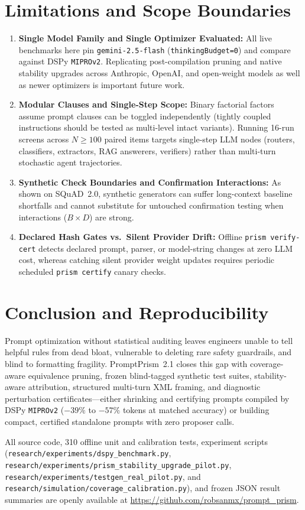 \documentclass[11pt,a4paper]{article}
\newcommand{\method}{PromptPrism}
\begin{document}
\section{Limitations and Scope Boundaries}
\begin{enumerate}[leftmargin=*,nosep]
    \item \textbf{Single Model Family and Single Optimizer Evaluated:} All live benchmarks here pin \texttt{gemini-2.5-flash} (\texttt{thinkingBudget=0}) and compare against DSPy \texttt{MIPROv2}. Replicating post-compilation pruning and native stability upgrades across Anthropic, OpenAI, and open-weight models as well as newer optimizers is important future work.
    \item \textbf{Modular Clauses and Single-Step Scope:} Binary factorial factors assume prompt clauses can be toggled independently (tightly coupled instructions should be tested as multi-level intact variants). Running 16-run screens across $N \ge 100$ paired items targets single-step LLM nodes (routers, classifiers, extractors, RAG answerers, verifiers) rather than multi-turn stochastic agent trajectories.
    \item \textbf{Synthetic Check Boundaries and Confirmation Interactions:} As shown on SQuAD~2.0, synthetic generators can suffer long-context baseline shortfalls and cannot substitute for untouched confirmation testing when interactions ($B \times D$) are strong.
    \item \textbf{Declared Hash Gates vs.\ Silent Provider Drift:} Offline \texttt{prism verify-cert} detects declared prompt, parser, or model-string changes at zero LLM cost, whereas catching silent provider weight updates requires periodic scheduled \texttt{prism certify} canary checks.
\end{enumerate}

\section{Conclusion and Reproducibility}
Prompt optimization without statistical auditing leaves engineers unable to tell helpful rules from dead bloat, vulnerable to deleting rare safety guardrails, and blind to formatting fragility. \method{}~2.1 closes this gap with coverage-aware equivalence pruning, frozen blind-tagged synthetic test suites, stability-aware attribution, structured multi-turn XML framing, and diagnostic perturbation certificates---either shrinking and certifying prompts compiled by DSPy \texttt{MIPROv2} ($-39\%$ to $-57\%$ tokens at matched accuracy) or building compact, certified standalone prompts with zero proposer calls.

{\raggedright
All source code, 310 offline unit and calibration tests, experiment scripts (\nolinkurl{research/experiments/dspy_benchmark.py}, \nolinkurl{research/experiments/prism_stability_upgrade_pilot.py}, \nolinkurl{research/experiments/testgen_real_pilot.py}, and \nolinkurl{research/simulation/coverage_calibration.py}), and frozen JSON result summaries are openly available at \url{https://github.com/robsanmx/prompt_prism}.\par}



\end{document}
